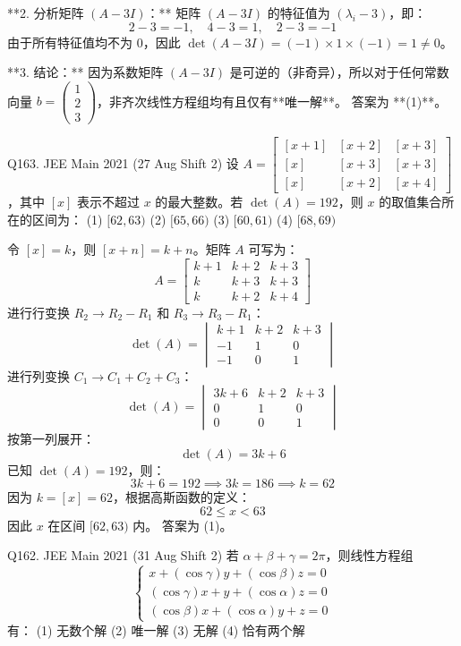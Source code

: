 \begin{questions}
\begin{solution}
**2. 分析矩阵 $(A - 3I)$：**
矩阵 $(A - 3I)$ 的特征值为 $(\lambda_i - 3)$，即：
\[ 2-3 = -1, \quad 4-3 = 1, \quad 2-3 = -1 \]
由于所有特征值均不为 0，因此 $\det(A - 3I) = (-1) \times 1 \times (-1) = 1 \neq 0$。

**3. 结论：**
因为系数矩阵 $(A - 3I)$ 是可逆的（非奇异），所以对于任何常数向量 $b = \begin{pmatrix} 1 \\ 2 \\ 3 \end{pmatrix}$，非齐次线性方程组均有且仅有**唯一解**。
答案为 **(1)**。
\end{solution}

\question
Q163. JEE Main 2021 (27 Aug Shift 2)
设 $A = \begin{bmatrix} [x + 1] & [x + 2] & [x + 3] \\ [x] & [x + 3] & [x + 3] \\ [x] & [x + 2] & [x + 4] \end{bmatrix}$，其中 $[x]$ 表示不超过 $x$ 的最大整数。若 $\det(A) = 192$，则 $x$ 的取值集合所在的区间为：
(1) $[62, 63)$ \quad (2) $[65, 66)$ \quad (3) $[60, 61)$ \quad (4) $[68, 69)$

\begin{solution}
令 $[x] = k$，则 $[x + n] = k + n$。矩阵 $A$ 可写为：
\[
A = \begin{bmatrix} k + 1 & k + 2 & k + 3 \\ k & k + 3 & k + 3 \\ k & k + 2 & k + 4 \end{bmatrix}
\]
进行行变换 $R_2 \to R_2 - R_1$ 和 $R_3 \to R_3 - R_1$：
\[
\det(A) = \begin{vmatrix} k + 1 & k + 2 & k + 3 \\ -1 & 1 & 0 \\ -1 & 0 & 1 \end{vmatrix}
\]
进行列变换 $C_1 \to C_1 + C_2 + C_3$：
\[
\det(A) = \begin{vmatrix} 3k + 6 & k + 2 & k + 3 \\ 0 & 1 & 0 \\ 0 & 0 & 1 \end{vmatrix}
\]
按第一列展开：
\[
\det(A) = 3k + 6
\]
已知 $\det(A) = 192$，则：
\[
3k + 6 = 192 \implies 3k = 186 \implies k = 62
\]
因为 $k = [x] = 62$，根据高斯函数的定义：
\[
62 \le x < 63
\]
因此 $x$ 在区间 $[62, 63)$ 内。
答案为 (1)。
\end{solution}

\question
Q162. JEE Main 2021 (31 Aug Shift 2)
若 $\alpha + \beta + \gamma = 2\pi$，则线性方程组
\[
\begin{cases}
x + (\cos \gamma)y + (\cos \beta)z = 0 \\
(\cos \gamma)x + y + (\cos \alpha)z = 0 \\
(\cos \beta)x + (\cos \alpha)y + z = 0
\end{cases}
\]
有：
(1) 无数个解 \quad (2) 唯一解 \quad (3) 无解 \quad (4) 恰有两个解


\end{questions}
